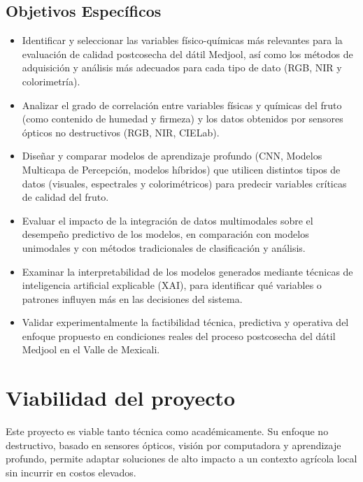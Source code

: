 \subsection{Objetivos Específicos}

\begin{itemize}
    \item Identificar y seleccionar las variables físico-químicas más relevantes para la evaluación de calidad postcosecha del dátil Medjool, así como los métodos de adquisición y análisis más adecuados para cada tipo de dato (RGB, NIR y colorimetría).
    \item Analizar el grado de correlación entre variables físicas y químicas del fruto (como contenido de humedad y firmeza) y los datos obtenidos por sensores ópticos no destructivos (RGB, NIR, CIELab).
    \item Diseñar y comparar modelos de aprendizaje profundo (CNN, Modelos Multicapa de Percepción, modelos híbridos) que utilicen distintos tipos de datos (visuales, espectrales y colorimétricos) para predecir variables críticas de calidad del fruto.
    \item Evaluar el impacto de la integración de datos multimodales sobre el desempeño predictivo de los modelos, en comparación con modelos unimodales y con métodos tradicionales de clasificación y análisis.
    \item Examinar la interpretabilidad de los modelos generados mediante técnicas de inteligencia artificial explicable (XAI), para identificar qué variables o patrones influyen más en las decisiones del sistema.
    \item Validar experimentalmente la factibilidad técnica, predictiva y operativa del enfoque propuesto en condiciones reales del proceso postcosecha del dátil Medjool en el Valle de Mexicali.
\end{itemize}


\section{Viabilidad del proyecto}

Este proyecto es viable tanto técnica como académicamente. Su enfoque no destructivo, basado en sensores ópticos, visión por computadora y aprendizaje profundo, permite adaptar soluciones de alto impacto a un contexto agrícola local sin incurrir en costos elevados.\\

